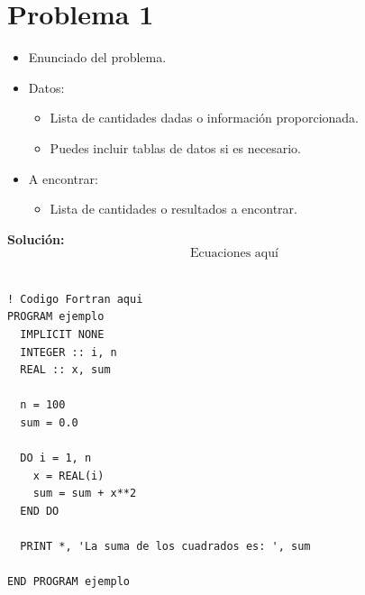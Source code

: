 \documentclass[10pt,a4paper]{article}
\begin{document}
\section*{Problema 1}
\begin{itemize}
    \item Enunciado del problema.
    \item Datos:
        \begin{itemize}
            \item Lista de cantidades dadas o información proporcionada.
            \item Puedes incluir tablas de datos si es necesario.
        \end{itemize}
    \item A encontrar:
        \begin{itemize}
            \item Lista de cantidades o resultados a encontrar.
        \end{itemize}
\end{itemize}

\textbf{Soluci\'on:}
\begin{equation}
    \text{Ecuaciones aquí}
\end{equation}
\\

\begin{lstlisting}
! Codigo Fortran aqui
PROGRAM ejemplo
  IMPLICIT NONE
  INTEGER :: i, n
  REAL :: x, sum

  n = 100
  sum = 0.0

  DO i = 1, n
    x = REAL(i)
    sum = sum + x**2
  END DO

  PRINT *, 'La suma de los cuadrados es: ', sum

END PROGRAM ejemplo
\end{lstlisting}
\end{document}
